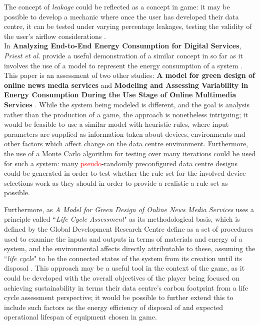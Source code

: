 The concept of \emph{leakage} could be reflected as a concept in game: it may be possible to develop a mechanic where once the user has developed their data centre, it can be tested under varying percentage leakages, testing the validity of the user's airflow considerations \cite[The Numbers: How Much Can You Really Save Through Environmental Optimization?]{SeeberAndSeeberImprovingDataCenterEnergyEfficiencyThroughEnvironmentalOptimization}.
\\

In \textbf{Analyzing End-to-End Energy Consumption for Digital Services}, \emph{Priest et al.} provide a useful demonstration of a similar concept in so far as it involves the use of a model to represent the energy consumption of a system \cite{PreistEtAlAnalysingEndToEndEnergyConsumptionForDigitalServices}. This paper is an assessment of two other studies: \textbf{A model for green design of online news media services} \cite{SchienEtAlAModelForGreenDesignOfOnlineNewsMediaServices} and \textbf{Modeling and Assessing Variability in Energy Consumption During the Use Stage of Online Multimedia Services} \cite{SchienEtAllModelingAndAssessingVariabilityInEnergyConsumptionDuringTheUseStageOfOnlineMultimediaServices}. While the system being modeled is different, and the goal is analysis rather than the production of a game, the approach is nonetheless intriguing; it would be feasible to use a similar model with heuristic rules, where input parameters are supplied as information taken about devices, environments and other factors which affect change on the \gls{data centre} environment. Furthermore, the use of a Monte Carlo algorithm for testing over many iterations could be used for such a system: many \textcolor{red}{pseudo}-randomly preconfigured \gls{data centre} designs could be generated in order to test whether the rule set for the involved device selections work as they should in order to provide a realistic a rule set as possible.

Furthermore, as \emph{A Model for Green Design of Online News Media Services} uses a principle called ``\emph{Life Cycle Assessment}" as its methodological basis, which is defined by the Global Development Research Centre define as a set of procedures used to examine the inputs and outputs in terms of materials and energy of a system, and the environmental affects directly attributable to these, assuming the ``\emph{life cycle}" to be the connected states of the system from its creation until its disposal \cite{GDRCLifeCycleAssessmentDefinition}. This approach may be a useful tool in the context of the game, as it could be developed with the overall objectives of the player being focused on achieving sustainability in terms their \gls{data centre}'s carbon footprint from a life cycle assessment perspective; it would be possible to further extend this to include such factors as the energy efficiency of disposal of and expected operational lifespan of equipment chosen in game.

